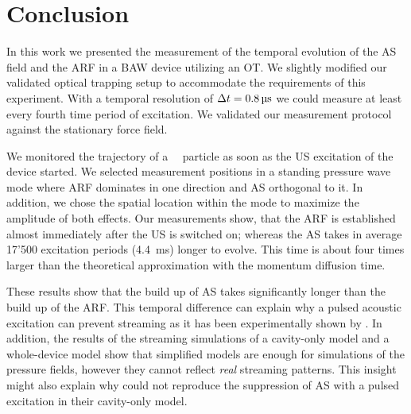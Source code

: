 \section{Conclusion\label{sec:conclusion}}

In this work we presented the measurement of the temporal evolution of the AS 
field and the ARF in a BAW device utilizing an OT. We slightly modified our 
validated optical trapping setup \cite{Lamprecht2016,Lamprecht2021} to 
accommodate the requirements of this experiment. With a temporal resolution of 
$\Dt=\SI{0.8}{\us}$ we could measure at least every fourth time period of 
excitation. We validated our measurement protocol against the stationary force 
field.

We monitored the trajectory of a \Dtwo~\SiO~particle as soon as the US 
excitation of the device started. We selected measurement positions in a 
standing pressure wave mode where ARF dominates in one direction and AS 
orthogonal to it. In addition, we chose the spatial location within the mode 
to maximize the amplitude of both effects. Our measurements show, that the ARF 
is established almost immediately after the US is switched on; whereas the AS 
takes in average 17'500 excitation periods (\SI{4.4}{\ms}) longer to evolve. 
This time is about four times larger than the theoretical approximation with 
the momentum diffusion time.

These results show that the build up of AS takes significantly longer than the 
build up of the ARF. This temporal difference can explain why a pulsed acoustic 
excitation can prevent streaming as it has been experimentally shown by 
\citeauthor{Hoyos2013} \cite{Hoyos2013,Castro2016}. In addition, the results of 
the streaming simulations of a cavity-only model and a whole-device model show 
that simplified models are enough for simulations of the pressure fields, 
however they cannot reflect \emph{real} streaming patterns. This insight might 
also explain why \citeauthor{Muller2015} could not reproduce the suppression of 
AS with a pulsed excitation in their cavity-only model.
